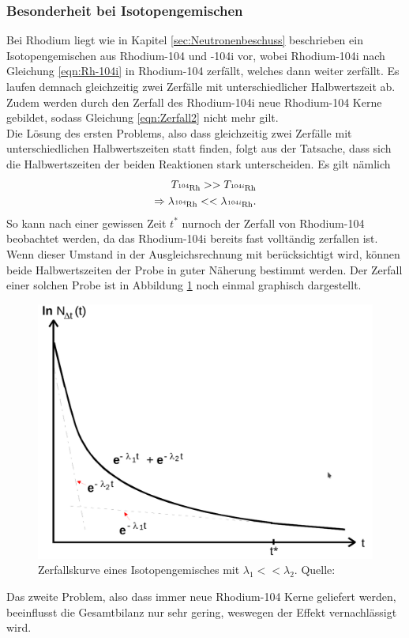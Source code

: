 \subsubsection*{Besonderheit bei Isotopengemischen}
Bei Rhodium liegt wie in Kapitel \ref{sec:Neutronenbeschuss} beschrieben ein Isotopengemischen aus 
Rhodium-104 und -104i vor, wobei Rhodium-104i nach Gleichung \ref{eqn:Rh-104i} in Rhodium-104 zerfällt,
welches dann weiter zerfällt. Es laufen demnach gleichzeitig zwei Zerfälle mit unterschiedlicher 
Halbwertszeit ab. Zudem werden durch den Zerfall des Rhodium-104i neue Rhodium-104 Kerne gebildet, sodass
Gleichung \ref{eqn:Zerfall2} nicht mehr gilt.\\
Die Lösung des ersten Problems, also dass gleichzeitig zwei Zerfälle mit unterschiedlichen 
Halbwertszeiten statt finden, folgt aus der Tatsache, dass sich die Halbwertszeiten der beiden Reaktionen
stark unterscheiden. Es gilt nämlich
\begin{align*}
    T_{\ce{^{104}Rh}}>>T_{\ce{^{104i}Rh}}\\
    \Rightarrow
    \lambda_{\ce{^{104}Rh}}<<\lambda_{\ce{^{104i}Rh}}.
\end{align*}
So kann nach einer gewissen Zeit $t^*$ nurnoch der Zerfall von Rhodium-104 beobachtet werden, da das 
Rhodium-104i bereits fast volltändig zerfallen ist. Wenn dieser Umstand in der Ausgleichsrechnung 
mit berücksichtigt wird, können beide Halbwertszeiten der Probe in guter Näherung bestimmt werden.
Der Zerfall einer solchen Probe ist in Abbildung \ref{fig:Isotopengemisch} noch einmal graphisch 
dargestellt. 
\begin{figure}[H]
    \centering
    \includegraphics[scale=0.4]{content/Isotopengemisch.png}
    \caption{Zerfallskurve eines Isotopengemisches mit $\lambda_1<<\lambda_2$. Quelle:\cite{AP01}}
    \label{fig:Isotopengemisch}
  \end{figure}
\noindent Das zweite Problem, also dass immer neue Rhodium-104 Kerne geliefert werden, beeinflusst die 
Gesamtbilanz nur sehr gering, weswegen der Effekt vernachlässigt wird. 